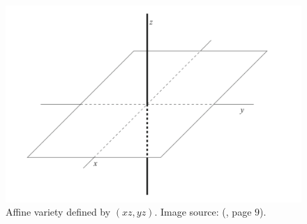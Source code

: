 \documentclass[thesis=M,english]{FITthesis}[2012/10/20]
\theoremstyle{remark}
\theoremstyle{definition}
\begin{document}
 \begin{figure}[h]
 \centering
 	\includegraphics[width=1.0\textwidth]{affineVariety.png}
 	\caption[Example of an affine variety]{Affine variety defined by $(xz,yz)$. Image source: (\cite{algGeom}, page $9$).}
 	\label{fig1}
 \end{figure}
\end{document}
